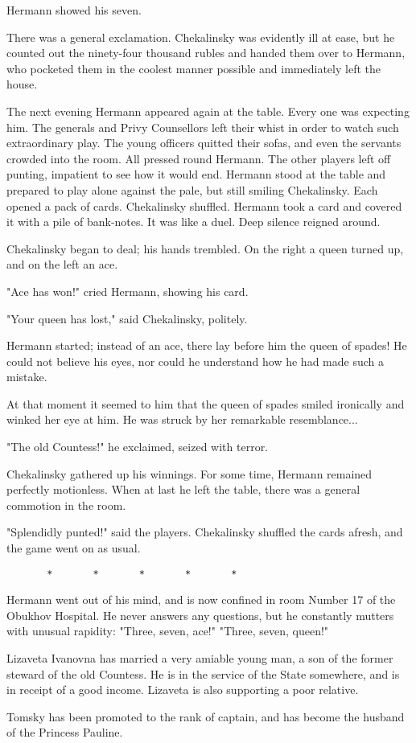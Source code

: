 Hermann showed his seven.

There was a general exclamation. Chekalinsky was evidently ill at
ease, but he counted out the ninety-four thousand rubles and handed
them over to Hermann, who pocketed them in the coolest manner possible
and immediately left the house.

The next evening Hermann appeared again at the table. Every one was
expecting him. The generals and Privy Counsellors left their whist in
order to watch such extraordinary play. The young officers quitted
their sofas, and even the servants crowded into the room. All pressed
round Hermann. The other players left off punting, impatient to see
how it would end. Hermann stood at the table and prepared to play
alone against the pale, but still smiling Chekalinsky. Each opened a
pack of cards. Chekalinsky shuffled. Hermann took a card and covered
it with a pile of bank-notes. It was like a duel. Deep silence reigned
around.

Chekalinsky began to deal; his hands trembled. On the right a queen
turned up, and on the left an ace.

"Ace has won!" cried Hermann, showing his card.

"Your queen has lost," said Chekalinsky, politely.

Hermann started; instead of an ace, there lay before him the queen of
spades! He could not believe his eyes, nor could he understand how he
had made such a mistake.

At that moment it seemed to him that the queen of spades smiled
ironically and winked her eye at him. He was struck by her remarkable
resemblance...

"The old Countess!" he exclaimed, seized with terror.

Chekalinsky gathered up his winnings. For some time, Hermann remained
perfectly motionless. When at last he left the table, there was a
general commotion in the room.

"Splendidly punted!" said the players. Chekalinsky shuffled the cards
afresh, and the game went on as usual.

\begin{center}
    \begin{verbatim}
       *       *       *       *       *
   \end{verbatim}
\end{center}

Hermann went out of his mind, and is now confined in room Number 17 of
the Obukhov Hospital. He never answers any questions, but he
constantly mutters with unusual rapidity: "Three, seven, ace!" "Three,
seven, queen!"

Lizaveta Ivanovna has married a very amiable young man, a son of the
former steward of the old Countess. He is in the service of the State
somewhere, and is in receipt of a good income. Lizaveta is also
supporting a poor relative.

Tomsky has been promoted to the rank of captain, and has become the
husband of the Princess Pauline.
